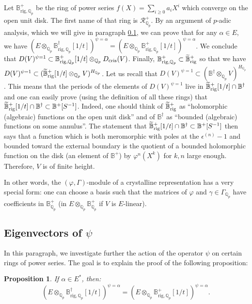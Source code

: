 \documentclass[11pt]{amsart}
\def\Q{{\mathbb Q}_p}
\def\bplus{\mathbb{B}^+}
\newcommand{\bdag}[1]{\mathbb{B}^{\dagger #1}}
\newcommand{\bhol}[1]{\mathbb{B}^+_{\mathrm{rig} #1}}
\newcommand{\bnrig}[2]{\mathbb{B}^{\dagger #1}_{\mathrm{rig} #2}}
\def\bcontp{\widetilde{\mathbb{B}}^+_{\rm rig}}
\def\dcris{D_{\rm cris}}
\newtheorem{prop}[definit]{\bf{Proposition}}
\begin{document}
Let $\bhol{,\Q}$ be the ring of power series $f(X)=\sum_{i \geq 0} a_i 
X^i$ which converge on the open unit disk. The first name of that ring 
is $\mathcal{R}_{\Q}^+$. By an argument of $p$-adic analysis,  
which we will give in paragraph \ref{psianal}, we can 
prove that for any $\alpha \in E$, we have 
$(E \otimes_{\Q} \bnrig{}{,\Q}[1/t])^{\psi=\alpha} = (E \otimes_{\Q} \bhol{,\Q} 
[1/t])^{\psi=\alpha}$. We conclude that $D(V)^{\psi=1} \subset \bhol{,\Q} 
[1/t] \otimes_{\Q} \dcris(V)$. Finally, $\bhol{,\Q} \subset \bcontp$ 
so that we have $D(V)^{\psi=1} \subset (\bcontp [1/t] \otimes_{\Q} 
V)^{H_{\Q}}$. Let us recall that $D(V)^{\psi=1}  \subset (\bdag{} \otimes_{\Q} 
V)^{H_{\Q}}$. This means that the periods of the elements of 
$D(V)^{\psi=1}$ live in $\bcontp[1/t] \cap \bdag{}$ and one can easily 
prove (using the definition of all these rings) that $\bcontp[1/t] 
\cap \bdag{} \subset \bplus[S^{-1}]$. Indeed, one should  
think of $\bcontp$ as ``holomorphic (algebraic) functions on the open 
unit disk'' and of $\bdag{}$ as ``bounded (algebraic) functions on 
some annulus''. The statement that $\bcontp[1/t] 
\cap \bdag{} \subset \bplus[S^{-1}]$ then says that a function which 
is both meromorphic with poles at the $\epsilon^{(n)}-1$ and bounded 
toward the external boundary is the quotient of a bounded holomorphic 
function on the disk (an element of $\bplus$) by $\varphi^n(X^k)$ for 
$k,n$ large enough. Therefore, $V$ is of finite height. 
 
In other words, the $(\varphi,\Gamma)$-module of a crystalline 
representation has a very special form: one can choose a basis such 
that the matrices of $\varphi$ and $\gamma \in \Gamma_{\Q}$ have 
coefficients in $\bplus_{\Q}$ (in $E \otimes_{\Q} \bplus_{\Q}$ if $V$ 
is $E$-linear).  
   
\subsection{Eigenvectors of $\psi$}\label{psianal} 
In this paragraph, we investigate further the action of the operator 
$\psi$ on certain rings of power series. 
The goal is to explain the proof of the following proposition:  
\begin{prop}\label{egvpsi} 
If $\alpha \in E^*$, then:  
\[ (E \otimes_{\Q}  
\bnrig{}{,\Q}[1/t])^{\psi=\alpha} = (E \otimes_{\Q} \bhol{,\Q} 
[1/t])^{\psi=\alpha}. \] 
\end{prop} 
  
\end{document}
